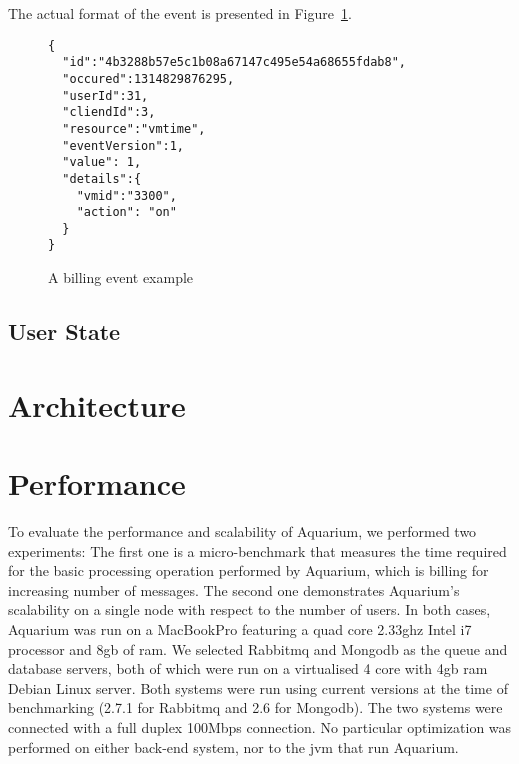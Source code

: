 \documentclass[preprint,10pt]{sigplanconf}
\begin{document}
The actual format of the event is presented in Figure~\ref{fig:resevt}.

\begin{figure}
\lstset{language=C, basicstyle=\footnotesize,
stringstyle=\ttfamily, 
flexiblecolumns=true, aboveskip=-0.9em, belowskip=0em, lineskip=0em}

\begin{lstlisting}
{
  "id":"4b3288b57e5c1b08a67147c495e54a68655fdab8",
  "occured":1314829876295,
  "userId":31,
  "cliendId":3,
  "resource":"vmtime",
  "eventVersion":1,
  "value": 1,
  "details":{
    "vmid":"3300",
    "action": "on"
  }
}
\end{lstlisting}
\caption{A billing event example} 
\label{fig:resevt}

\end{figure}

\subsection{User State}
\label{sec:ustate}

\section{Architecture}


\section{Performance}

To evaluate the performance and scalability of Aquarium, we performed two
experiments: The first one is a micro-benchmark that measures the time required
for the basic processing operation performed by Aquarium, which is billing for
increasing number of messages. The second one demonstrates Aquarium's
scalability on a single node with respect to the number of users.  In both
cases, Aquarium was run on a MacBookPro featuring a quad core 2.33{\sc g}hz
Intel i7 processor and 8{\sc gb} of {\sc ram}. We selected Rabbit{\sc mq} and
Mongo{\sc db} as the queue and database servers, both of which were run on a
virtualised 4 core with 4{\sc gb} {\sc ram} Debian Linux server. Both systems
were run using current versions at the time of benchmarking (2.7.1 for
Rabbit{\sc mq} and 2.6 for Mongo{\sc db}).  The two systems were connected with
a full duplex 100Mbps connection.  No particular optimization was performed on
either back-end system, nor to the {\sc jvm} that run Aquarium. 
\end{document}
